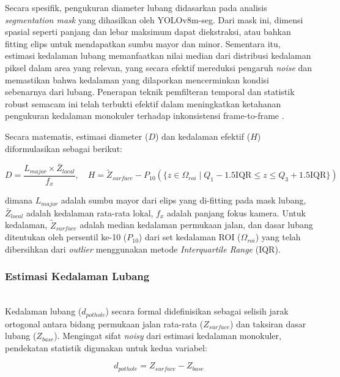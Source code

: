 \documentclass{iopjournal}
\begin{document}
Secara spesifik, pengukuran diameter lubang didasarkan pada analisis \textit{segmentation mask} yang dihasilkan oleh YOLOv8m-seg. Dari mask ini, dimensi spasial seperti panjang dan lebar maksimum dapat diekstraksi, atau bahkan fitting elips untuk mendapatkan sumbu mayor dan minor. Sementara itu, estimasi kedalaman lubang memanfaatkan nilai median dari distribusi kedalaman piksel dalam area yang relevan, yang secara efektif mereduksi pengaruh \textit{noise} dan memastikan bahwa kedalaman yang dilaporkan mencerminkan kondisi sebenarnya dari lubang. Penerapan teknik pemfilteran temporal dan statistik robust semacam ini telah terbukti efektif dalam meningkatkan ketahanan pengukuran kedalaman monokuler terhadap inkonsistensi frame-to-frame \cite{wang2025}.

Secara matematis, estimasi diameter ($D$) dan kedalaman efektif ($H$) diformulasikan sebagai berikut:

\begin{equation}
D = \frac{L_{major} \times \bar{Z}_{local}}{f_x}, \quad H = \tilde{Z}_{surface} - P_{10}(\{z \in \Omega_{roi} \mid Q_1 - 1.5 \text{IQR} \le z \le Q_3 + 1.5 \text{IQR}\})
\end{equation}

dimana $L_{major}$ adalah sumbu mayor dari elips yang di-fitting pada mask lubang, $\bar{Z}_{local}$ adalah kedalaman rata-rata lokal, $f_x$ adalah panjang fokus kamera. Untuk kedalaman, $\tilde{Z}_{surface}$ adalah median kedalaman permukaan jalan, dan dasar lubang ditentukan oleh persentil ke-10 ($P_{10}$) dari set kedalaman ROI ($\Omega_{roi}$) yang telah dibersihkan dari \textit{outlier} menggunakan metode \textit{Interquartile Range} (IQR).


\subsubsection{Estimasi Kedalaman Lubang}
\mbox{}\\
Kedalaman lubang ($d_{pothole}$) secara formal didefinisikan sebagai selisih jarak ortogonal antara bidang permukaan jalan rata-rata ($Z_{surface}$) dan taksiran dasar lubang ($Z_{base}$). Mengingat sifat \textit{noisy} dari estimasi kedalaman monokuler, pendekatan statistik digunakan untuk kedua variabel:

\begin{equation}
d_{pothole} = Z_{surface} - Z_{base}
\end{equation}
\end{document}
